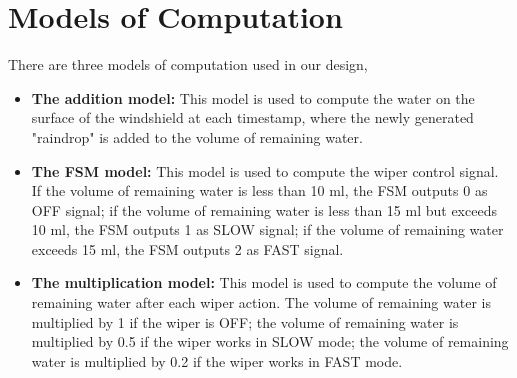 \section{Models of Computation}
There are three models of computation used in our design,
\begin{itemize}
    \item \textbf{The addition model:} This model is used to compute the water on the surface of the windshield at each timestamp, where the newly generated "raindrop" is added to the volume of remaining water.
    \item \textbf{The FSM model:} This model is used to compute the wiper control signal. If the volume of remaining water is less than 10 ml, the FSM outputs 0 as OFF signal; if the volume of remaining water is less than 15 ml but exceeds 10 ml, the FSM outputs 1 as SLOW signal; if the volume of remaining water exceeds 15 ml, the FSM outputs 2 as FAST signal.
    \item \textbf{The multiplication model:} This model is used to compute the volume of remaining water after each wiper action. The volume of remaining water is multiplied by 1 if the wiper is OFF; the volume of remaining water is multiplied by 0.5 if the wiper works in SLOW mode; the volume of remaining water is multiplied by 0.2 if the wiper works in FAST mode.
\end{itemize}